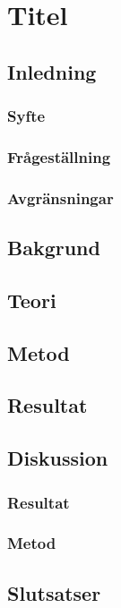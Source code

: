 \section{Titel}
\subsection{Inledning}
\subsubsection{Syfte}
\subsubsection{Frågeställning}
\subsubsection{Avgränsningar}
\subsection{Bakgrund}
\subsection{Teori}
\subsection{Metod}
\subsection{Resultat}
\subsection{Diskussion}
\subsubsection{Resultat}
\subsubsection{Metod}
\subsection{Slutsatser}
